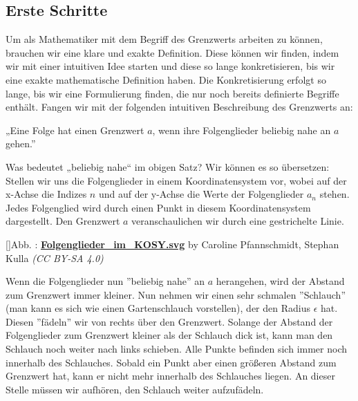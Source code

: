 \documentclass[fontsize=9pt,
               parskip=half-,
               DIV=14,
               listof=chapterentry,
               tocflat]{scrbook}
\newcounter{imagelabel}
\begin{document}
\subsection{Erste Schritte}

Um als Mathematiker mit dem Begriff des Grenzwerts arbeiten zu können, brauchen wir eine klare und exakte Definition. Diese können wir finden, indem wir mit einer intuitiven Idee starten und diese so lange konkretisieren, bis wir eine exakte mathematische Definition haben. Die Konkretisierung erfolgt so lange, bis wir eine Formulierung finden, die nur noch bereits definierte Begriffe enthält. Fangen wir mit der folgenden intuitiven Beschreibung des Grenzwerts an:

\begin{importantparagraph*}
„Eine Folge hat einen Grenzwert $a$, wenn ihre Folgenglieder beliebig nahe an $a$ gehen.”

\end{importantparagraph*}

Was bedeutet „beliebig nahe“ im obigen Satz? Wir können es so übersetzen: Stellen wir uns die Folgenglieder in einem Koordinatensystem vor, wobei auf der x-Achse die Indizes $n$ und auf der y-Achse die Werte der Folgenglieder $a_{n}$ stehen. Jedes Folgenglied wird durch einen Punkt in diesem Koordinatensystem dargestellt. Den Grenzwert $a$ veranschaulichen wir durch eine gestrichelte Linie.

[]{Abb. : \protect\href{https://commons.wikimedia.org/wiki/File:Folgenglieder_im_KOSY.svg}{\textbf{Folgenglieder\allowbreak\_im\allowbreak\_KOSY.svg}} by Caroline Pfannschmidt, Stephan Kulla \textit{(CC BY-SA 4.0)}}\begin{center}
\end{center}

Wenn die Folgenglieder nun {''}beliebig nahe{''} an $a$ herangehen, wird der Abstand zum Grenzwert immer kleiner. Nun nehmen wir einen sehr schmalen {''}Schlauch{''} (man kann es sich wie einen Gartenschlauch vorstellen), der den Radius $\epsilon $ hat. Diesen {''}fädeln{''} wir von rechts über den Grenzwert. Solange der Abstand der Folgenglieder zum Grenzwert kleiner als der Schlauch dick ist, kann man den Schlauch noch weiter nach links schieben. Alle Punkte befinden sich immer noch innerhalb des Schlauches. Sobald ein Punkt aber einen größeren Abstand zum Grenzwert hat, kann er nicht mehr innerhalb des Schlauches liegen. An dieser Stelle müssen wir aufhören, den Schlauch weiter aufzufädeln.
\end{document}
